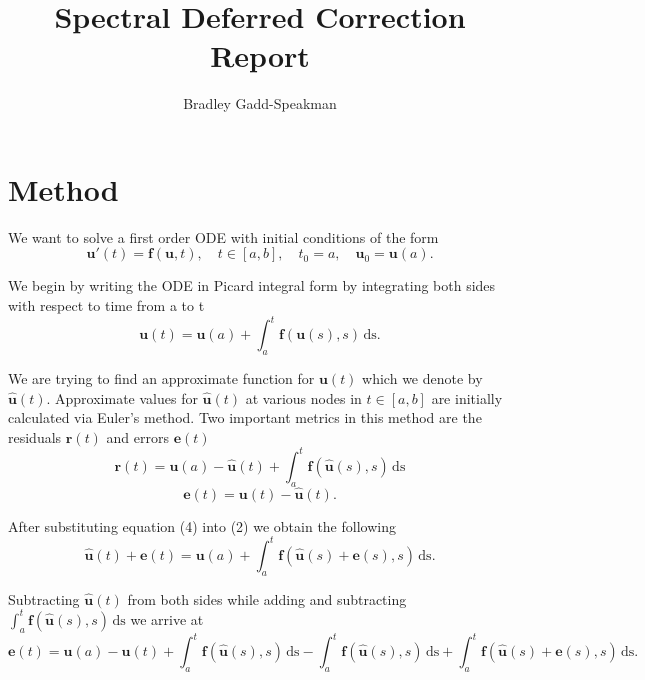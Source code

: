 \documentclass{article}
\title{Spectral Deferred Correction Report}
\author{Bradley Gadd-Speakman}
\newcommand{\V}{\textbf}
\begin{document}
\begin{titlepage}
    \maketitle
\end{titlepage}

\section{Method}

We want to solve a first order ODE with initial conditions of the form 
\begin{equation}
    \V{u}'(t) = \V{f}(\V{u}, t), \quad t \in [a, b], \quad t_0=a, \quad \V{u}_0=\V{u}(a).
\end{equation}

We begin by writing the ODE in Picard integral form
by integrating both sides with respect to time from a to t
\begin{equation}
    \V{u}(t) = \V{u}(a) + \int_a^t{\! \V{f}(\V{u}(s), s) \, \mathrm{ds}}.
\end{equation}

We are trying to find an approximate function for $\V{u}(t)$ which we
denote by $\hat{\V{u}}(t)$. Approximate values for $\hat{\V{u}}(t)$
at various nodes in $t \in [a, b]$ are initially calculated via
Euler's method. Two important metrics in this method are the residuals
$\V{r}(t)$ and errors $\V{e}(t)$
\begin{equation}
    \V{r}(t) = \V{u}(a) - \hat{\V{u}}(t) + \int_a^t{\! \V{f}(\hat{\V{u}}(s), s) \, \mathrm{ds}}
\end{equation}
\begin{equation}
    \V{e}(t) = \V{u}(t) - \hat{\V{u}}(t).
\end{equation}

After substituting equation (4) into (2) we obtain the following
\begin{equation}
    \hat{\V{u}}(t) + \V{e}(t) = \V{u}(a) + \int_a^t{\! \V{f}(\hat{\V{u}}(s) + \V{e}(s), s) \, \mathrm{ds}}.
\end{equation}

Subtracting $\hat{\V{u}}(t)$ from both sides while adding and subtracting 
$\int_a^t{\! \V{f}(\hat{\V{u}}(s), s) \, \mathrm{ds}}$ we arrive at
\begin{equation}
    \V{e}(t) = \V{u}(a) - \hat{\V{u}}(t) + \int_a^t{\! \V{f}(\hat{\V{u}}(s), s) \, \mathrm{ds}} 
    - \int_a^t{\! \V{f}(\hat{\V{u}}(s), s) \, \mathrm{ds}} + \int_a^t{\! \V{f}(\hat{\V{u}}(s) + \V{e}(s), s) \, \mathrm{ds}}.
\end{equation}
\end{document}
